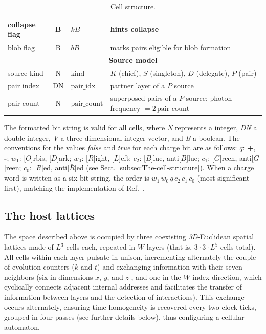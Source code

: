 \documentclass{ijuc}
\begin{document}
\begin{table}
\begin{centering}
\begin{tabular}{|l|c|l|l|}
\hline 
collapse flag & B & $kB$ & hints collapse\tabularnewline
\hline 
blob flag & B & $bB$ & marks pairs eligible for blob formation\tabularnewline
\hline 
\multicolumn{4}{|c|}{\textbf{Source model}}\tabularnewline
\hline 
source kind & N & $\mathrm{kind}$ & $K$ (chief), $S$ (singleton), $D$ (delegate), $P$ (pair)\tabularnewline
\hline 
pair index & DN & $\mathrm{pair\_idx}$ & partner layer of a $P$ source\tabularnewline
\hline 
pair count & N & $\mathrm{pair\_count}$ & superposed pairs of a $P$ source; photon frequency $=2\,\mathrm{pair\_count}$\tabularnewline
\hline 
\end{tabular}
\par\end{centering}

\caption{Cell structure.}

{\small{}The formatted bit string is valid for all cells, where }\emph{\small{}N}{\small{}
represents a integer, }\emph{\small{}DN}{\small{} 
a double integer, }\emph{\small{}V}{\small{} a three-dimensional integer vector, and }\emph{\small{}B}{\small{} 
a boolean. The conventions for the values }\emph{\small{}false}{\small{} and }\emph{\small{}true}{\small{} for each 
charge bit are as follows: $q$: }\textbf{\small{}+}{\small{}, }\textbf{\small{}-}{\small{}; $w_{1}$: {[}$O${]}rbis, {[}$D${]}ark; 
$w_{0}$: {[}$R${]}ight, {[}$L${]}eft; $c_{2}$: {[}$B${]}lue, anti{[}$\bar{B}${]}lue; $c_{1}$: {[}$G${]}reen, anti{[}$\bar{G}${]}reen; 
$c_{0}$: {[}$R${]}ed, anti{[}$\bar{R}${]}ed (see Sect. \ref{subsec:The-cell-structure}).  When a charge word is written as a six-bit string, the order is $w_{1}\,w_{0}\,q\,c_{2}\,c_{1}\,c_{0}$ (most significant first), matching the implementation of Ref.~\cite{af_neto}.}\label{tab:Cell-structure}
\end{table}

\subsection{The host lattices\label{subsec:The-host-lattice}}

The space described above is occupied by three coexisting \emph{3D}-Euclidean spatial lattices made of $L^{3}$ cells each, repeated in $W  $ layers (that is, $3\cdot3\cdot L^{5}$ cells total).
All cells within each layer pulsate in unison, incrementing alternately the couple of evolution counters ($k$ and $t$) and exchanging information with their seven neighbors (six in dimensions $x$, $y$, and \ensuremath{z} , and one in the $W$-index direction, which cyclically connects adjacent internal addresses and facilitates the transfer of information between layers and the detection of interactions).
This exchange occurs alternately, ensuring time homogeneity is recovered every two clock ticks, grouped in four passes (see further details below), thus configuring a cellular automaton.
\end{document}
